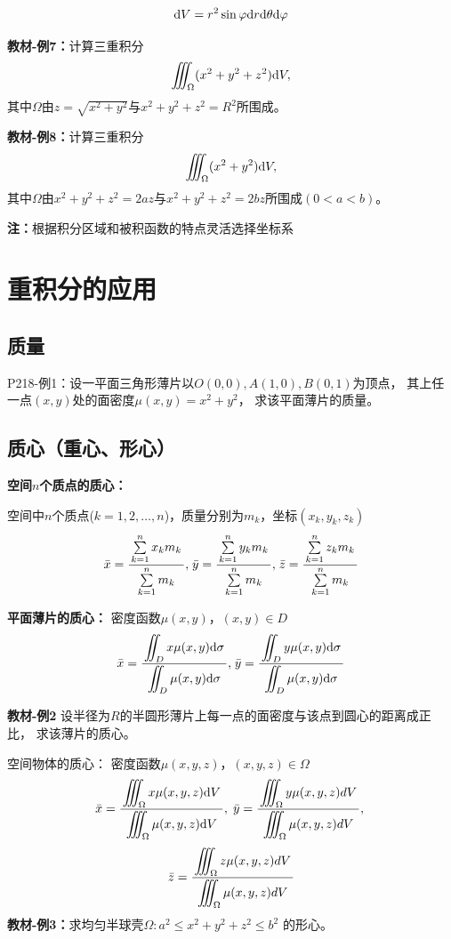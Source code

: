 $$\mathrm{d} V=r^2\sin\varphi \mathrm{d} r\mathrm{d}\theta \mathrm{d}\varphi$$

{\bf 教材-例7：}计算三重积分
$$\iiint_{\Omega}(x^2+y^2+z^2)\mathrm{d} V,$$
其中$\Omega$由$z=\sqrt{x^2+y^2}$与$x^2+y^2+z^2=R^2$所围成。

{\bf 教材-例8：}计算三重积分
$$\iiint_{\Omega}(x^2+y^2)\mathrm{d} V,$$
其中$\Omega$由$x^2+y^2+z^2=2az$与$x^2+y^2+z^2=2bz$所围成$(0<a<b)$。

{\bf 注：}根据积分区域和被积函数的特点灵活选择坐标系

\section{重积分的应用}

\subsection{质量}

{P218-例1：}设一平面三角形薄片以$O(0,0),A(1,0),B(0,1)$为顶点，
其上任一点$(x,y)$处的面密度$\mu(x,y)=x^2+y^2$，
求该平面薄片的质量。

\subsection{质心（重心、形心）}

{\bf 空间$n$个质点的质心：}
	
空间中$n$个质点($k=1,2,\ldots,n$)，质量分别为$m_k$，坐标$(x_k,y_k,z_k)$
$${\bar{x}=\displaystyle\frac{\,{\sum\limits_{k=1}^nx_km_k}\,}{\,{\sum\limits_{k=1}^nm_k}\,},}\;
{\bar{y}=\displaystyle\frac{\,{\sum\limits_{k=1}^ny_km_k}\,}{\,{\sum\limits_{k=1}^nm_k}\,},}\; 
{\bar{z}=\displaystyle\frac{\,{\sum\limits_{k=1}^nz_km_k}\,}{\,{\sum\limits_{k=1}^nm_k}\,}}$$

{\bf 平面薄片的质心：} 密度函数$\mu(x,y)$，$(x,y)\in D$
$${\bar{x}=\displaystyle\frac{\,{\displaystyle\iint_Dx\mu(x,y)\mathrm{d}\sigma}\,}{\,{\displaystyle\iint_D\mu(x,y)\mathrm{d}\sigma}\,},\;} 
{\bar{y}=\displaystyle\frac{\,{\displaystyle\iint_Dy\mu(x,y)\mathrm{d}\sigma}\,}{\,{\displaystyle\iint_D\mu(x,y)\mathrm{d}\sigma}\,}}$$

{\bf 教材-例2}
设半径为$R$的半圆形薄片上每一点的面密度与该点到圆心的距离成正比，
求该薄片的质心。

{\bb 空间物体的质心：} 密度函数$\mu(x,y,z)$，$(x,y,z)\in\Omega$
$$\bar{x}=\displaystyle\frac{\,{\displaystyle\iiint_{\Omega}x\mu(x,y,z)\mathrm{d} V}\,}{\,{\displaystyle\iiint_{\Omega}\mu(x,y,z)\mathrm{d} V}\,},\;
{\bar{y}=\displaystyle\frac{\,{\displaystyle\iiint_{\Omega}y\mu(x,y,z)dV}\,}{\,{\displaystyle\iiint_{\Omega}\mu(x,y,z)dV}\,},\;} $$
$${\bar{z}=\displaystyle\frac{\,{\displaystyle\iiint_{\Omega}z\mu(x,y,z)dV}\,}{\,{\displaystyle\iiint_{\Omega}\mu(x,y,z)dV}\,}}
$$
{\bf 教材-例3：}求均匀半球壳$\Omega:a^2\leq x^2+y^2+z^2\leq b^2$
的形心。

